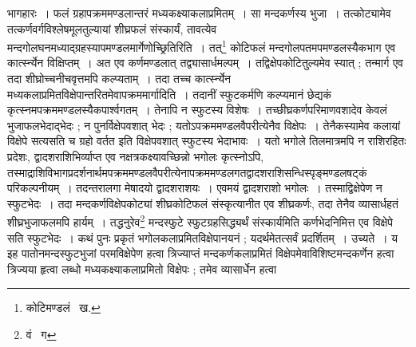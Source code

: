\documentclass[11pt, openany]{book}
\begin{document}
\noindent भागहारः~। फलं ग्रहापक्रममण्डलान्तरं मध्यकक्ष्याकलाप्रमितम्~। सा मन्दकर्णस्य भुजा~। तत्कोट्यामेव 
तत्कर्णवर्गविश्लेषमूलतुल्यायां शीघ्रफलं संस्कार्यं, तावत्येव मन्दगोलघनमध्याद्ग्रहस्यापमण्डलमार्गेणोच्छ्रितिरिति~। तत्\renewcommand{\thefootnote}{१}\footnote{कोटिमण्डलं \textendash\ ख.} कोटिफलं मन्दगोलपतमपमण्डलस्यैकभाग एव कार्त्स्न्येन विक्षिप्तम्~। अत एव कर्णमण्डलात् तद्व्यासार्धमल्पम्~। तद्विक्षेपकोटितुल्यमेव स्यात् ; तन्मार्ग एव तदा शीघ्रोच्चनीचवृत्तमपि कल्प्यताम्~। तदा तच्च कार्त्स्न्येन मध्यकलाप्रमितविक्षेपान्तरितमेवापक्रममार्गादिति~। तदानीं स्फुटकर्मणि कल्प्यमानं छेद्यकं कृत्स्नमपक्रममण्डलस्यैकपार्श्वगतम्~। तेनापि न स्फुटस्य विशेषः~। तच्छीघ्रकर्णपरिमाणवशादेव केवलं भुजाफलभेदाद्भेदः ; न 
पुनर्विक्षेपवशात् भेदः ; यतोऽपक्रममण्डलवैपरीत्येनैव विक्षेपः~। तेनैकस्यामेव कलायां विक्षेपे सत्यसति च ग्रहो वर्तत इति 
विक्षेपवशात् स्फुटस्य भेदाभावः~। यतो भगोले तिलमात्रमपि न राशिरहितः प्रदेशः, द्वादशराशिभिर्व्याप्त एव नक्षत्रकक्ष्यावच्छिन्नो भगोलः कृत्स्नोऽपि, तस्माद्राशिविभागप्रदर्शनार्थमपक्रममण्डलवैपरीत्येनापक्रममण्डलगतद्वादशराशिसन्धिस्पृङ्मण्डलषट्कं परिकल्पनीयम्~। तदन्तरालगा 
मेषादयो द्वादशराशयः~। एवमयं द्वादशराशो भगोलः~। तस्माद्विक्षेपेण न स्फुटभेदः~। तदा मन्दकर्णविक्षेपकोट्यां शीघ्रकोटिफलं संस्कृत्यानीत एव शीघ्रकर्णः, तदा तेनैव व्यासार्धहतं शीघ्रभुजाफलमपि हार्यम्~। तद्धनुरेव\renewcommand{\thefootnote}{२}\footnote{वं \textendash\ ग} मन्दस्फुटे स्फुटग्रहसिद्ध्यर्थं संस्कार्यमिति कर्णभेदनिमित्त एव विक्षेपे सति स्फुटभेदः~। कथं पुनः प्रकृतं भगोलकलाप्रमितविक्षेपानयनं ; 
यदर्थमेतत्सर्वं प्रदर्शितम्~। उच्यते~। य इह पातोनमन्दस्फुटभुजां परमविक्षेपेण हत्वा त्रिज्याप्तं मन्दकर्णकलाप्रमितं विक्षेपमेवाविशिष्टमन्दकर्णेन हत्वा त्रिज्यया हृत्वा लब्धो मध्यकक्ष्याकलाप्रमितो विक्षेपः ; तमेव व्यासार्धेन हत्वा 

\newpage
\end{document}
